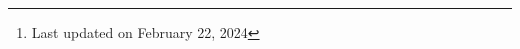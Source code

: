 \documentclass[a4paper, twoside]{article}
\title{\tbf{Rational points on varieties}}
\author{Cong Wen, 02/2024}
\date{}
\begin{document}
\maketitle
\thispagestyle{empty}
\begin{abstract}
	This is my self-use notes\footnote{Last updated on February 22, 2024} on  following~\cite{Serre1997,Poonen2017}.

	Please reach out if you find anything incorrect.

\end{abstract}
\tableofcontents










\end{document}
